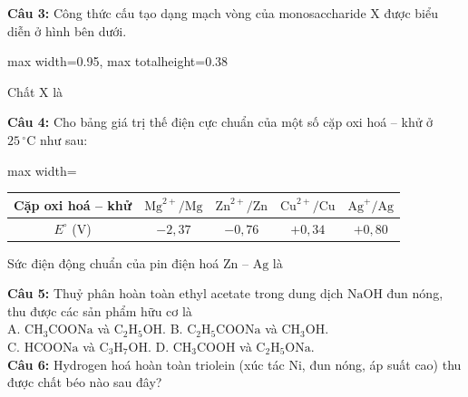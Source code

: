 \documentclass[12pt,a4paper]{article}
\begin{document}
\noindent \textbf{Câu 3:} Công thức cấu tạo dạng mạch vòng của monosaccharide X được biểu diễn ở hình bên dưới.\\
\begin{center}
\begin{adjustbox}{max width=0.95\linewidth, max totalheight=0.38\textheight}
\end{adjustbox}
\end{center}
Chất X là\\
\noindent{}

\noindent \textbf{Câu 4:} Cho bảng giá trị thế điện cực chuẩn của một số cặp oxi hoá -- khử ở $25\,^{\circ}\text{C}$ như sau:\\
\begin{center}
\begin{adjustbox}{max width=\linewidth}
\begin{tabular}{|c|c|c|c|c|}
\hline
Cặp oxi hoá -- khử & $\text{Mg}^{2+}/\text{Mg}$ & $\text{Zn}^{2+}/\text{Zn}$ & $\text{Cu}^{2+}/\text{Cu}$ & $\text{Ag}^{+}/\text{Ag}$ \\
\hline
$E^{\circ}$ (V) & $-2{,}37$ & $-0{,}76$ & $+0{,}34$ & $+0{,}80$ \\
\hline
\end{tabular}
\end{adjustbox}
\end{center}
Sức điện động chuẩn của pin điện hoá $\text{Zn}$ -- $\text{Ag}$ là\\
\noindent{}

\noindent \textbf{Câu 5:} Thuỷ phân hoàn toàn ethyl acetate trong dung dịch $\text{NaOH}$ đun nóng, thu được các sản phẩm hữu cơ là\\
\noindent A. $\text{CH}_3\text{COONa}$ và $\text{C}_2\text{H}_5\text{OH}$. \hfill B. $\text{C}_2\text{H}_5\text{COONa}$ và $\text{CH}_3\text{OH}$.\\
\noindent C. $\text{HCOONa}$ và $\text{C}_3\text{H}_7\text{OH}$. \hfill D. $\text{CH}_3\text{COOH}$ và $\text{C}_2\text{H}_5\text{ONa}$.\\

\noindent \textbf{Câu 6:} Hydrogen hoá hoàn toàn triolein (xúc tác $\text{Ni}$, đun nóng, áp suất cao) thu được chất béo nào sau đây?\\
\noindent{}
\end{document}
